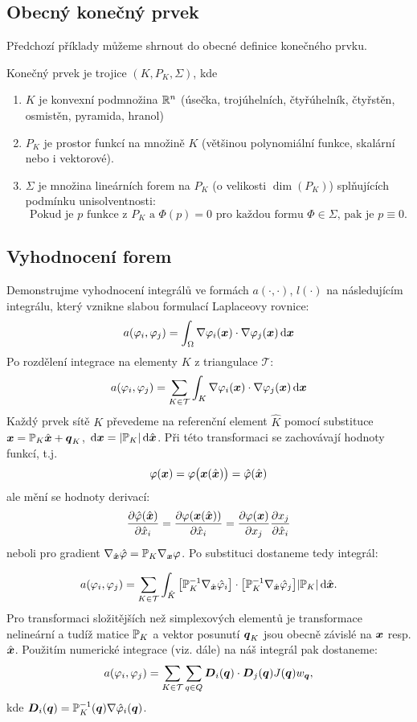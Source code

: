 \subsection{Obecný konečný prvek}
Předchozí příklady můžeme shrnout do obecné definice konečného prvku.
\begin{df}
Konečný prvek je trojice $(K, P_K, \Sigma)$, kde
\begin{enumerate}
 \item $K$ je konvexní podmnožina ${\mathbb R}^n$ (úsečka, trojúhelních, čtyřúhelník, čtyřstěn, osmistěn, pyramida, hranol)
 \item $P_K$ je prostor funkcí na množině $K$ (většinou polynomiální funkce, skalární nebo i vektorové). 
 \item $\Sigma$ je množina lineárních forem na $P_K$ (o velikosti $\dim(P_K)$) splňujících podmínku unisolventnosti:
 \[
    \text{Pokud je $p$ funkce z $P_K$ a $\Phi( p )=0$ pro každou formu $\Phi\in\Sigma$, pak je $p\equiv0$.}
 \]
\end{enumerate}
\end{df}


\subsection{Vyhodnocení forem}
Demonstrujme vyhodnocení integrálů ve formách $a(\cdot, \cdot)$, $l(\cdot)$ na následujícím integrálu, který vznikne slabou formulací Laplaceovy rovnice:
\[
 a(\varphi_i, \varphi_j) = \int_\Omega \nabla \varphi_i(\mathbf{\boldsymbol{x}}) \cdot \nabla \varphi_j(\mathbf{\boldsymbol{x}}) \,{\rm d} \mathbf{\boldsymbol{x}}
\]
Po rozdělení integrace na elementy $K$ z triangulace $\mathcal T$:
\[
 a(\varphi_i, \varphi_j) =\sum_{K\in \mathcal T} \int_K  \nabla \varphi_i(\mathbf{\boldsymbol{x}}) \cdot \nabla \varphi_j(\mathbf{\boldsymbol{x}}) \,{\rm d} \mathbf{\boldsymbol{x}} 
\]
Každý prvek sítě $K$ převedeme na referenční element $\hat K$ pomocí substituce 
${\mathbf{\boldsymbol{x}}} = {\mathbb{P}}_K \hat{\mathbf{\boldsymbol{x}}} + \mathbf{\boldsymbol{q}}_K$, $\,{\rm d} \mathbf{\boldsymbol{x}} = \lvert{\mathbb{P}}_K\rvert \,{\rm d} \hat{ \mathbf{\boldsymbol{x}}}$. 
Při této transformaci se zachovávají hodnoty funkcí, t.j. 
\[
    \varphi(\mathbf{\boldsymbol{x}}) = \varphi\big( \mathbf{\boldsymbol{x}}(\hat{\mathbf{\boldsymbol{x}}}) \big)=\hat {\varphi}(\hat{\mathbf{\boldsymbol{x}}}) 
\]
ale mění se hodnoty derivací:
\[
   \frac{\partial \hat{\varphi}(\hat{\mathbf{\boldsymbol{x}}}) }{\partial \hat{x}_i} = \frac{\partial \varphi(\mathbf{\boldsymbol{x}}(\hat{\mathbf{\boldsymbol{x}}})) }{\partial \hat{x}_i} = \frac{\partial \varphi(\mathbf{\boldsymbol{x}})}{\partial x_j}\frac{\partial x_j}{\partial \hat x_i}
\]
neboli pro gradient $\nabla_{\hat{\mathbf{\boldsymbol{x}}}} \hat {\varphi} = {\mathbb{P}}_K \nabla_{\mathbf{\boldsymbol{x}}} \varphi$. Po substituci dostaneme tedy integrál:

\[
  a(\varphi_i, \varphi_j) = \sum_{K\in \mathcal T} \int_{\hat K} 
        \big[ {\mathbb{P}}_K^{-1} \nabla_{\hat{\mathbf{\boldsymbol{x}}}} \hat{\varphi}_i \big] \cdot \big[ {\mathbb{P}}_K^{-1} \nabla_{\hat{ \mathbf{\boldsymbol{x}}}} {\hat {\varphi}}_j \big] \lvert{\mathbb{P}}_K\rvert \,{\rm d} \hat{\mathbf{\boldsymbol{x}}}.
\]
Pro transformaci složitějších než simplexových 
elementů je transformace nelineární a tudíž matice ${\mathbb{P}}_K$ a vektor posunutí $\mathbf{\boldsymbol{q}}_K$ jsou obecně závislé na $\mathbf{\boldsymbol{x}}$ resp. $\hat{\mathbf{\boldsymbol{x}}}$.
Použitím numerické integrace (viz. dále) na náš integrál pak dostaneme:
\[
 a(\varphi_i, \varphi_j) = \sum_{K\in \mathcal T} \sum_{q\in Q} \mathbf{\boldsymbol{D}}_i(\mathbf{\boldsymbol{q}}) \cdot  \mathbf{\boldsymbol{D}}_j(\mathbf{\boldsymbol{q}}) J(\mathbf{\boldsymbol{q}})w_{\mathbf{\boldsymbol{q}}},
\]                   
kde $\mathbf{\boldsymbol{D}}_i(\mathbf{\boldsymbol{q}}) = {\mathbb{P}}_K^{-1}(\mathbf{\boldsymbol{q}}) \nabla \hat {\varphi}_i(\mathbf{\boldsymbol{q}})$.

